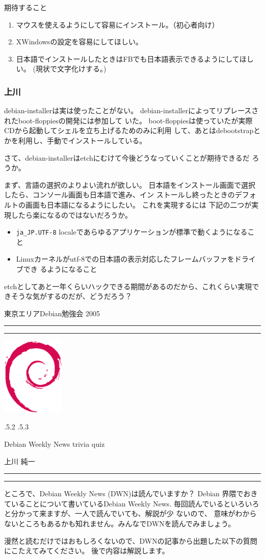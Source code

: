 \documentclass[mingoth]{jsarticle}
\makeatletter
\renewcommand{\section}{\@startsection{section}{1}{\z@}%
    {\Cvs \@plus.5\Cdp \@minus.2\Cdp}%
    {.5\Cvs \@plus.3\Cdp}%
    {\normalfont\Large\headfont\raggedright\centering}} %
\newcommand{\dancersection}[2]{%
\newpage
東京エリアDebian勉強会 2005
\hrule
\vspace{0.5mm}
\hrule
\hfill{}\includegraphics[width=3cm]{image200502/openlogo-nd.eps}\\
\vspace{-4cm}
\begin{center}
  \section{#1}
\end{center}
\hfill{}#2\hspace{3cm}\space\\
\hrule
\hrule
\vspace{1cm}
}
\makeatother
\begin{document}
期待すること
\begin{enumerate}
 \item	  マウスを使えるようにして容易にインストール。（初心者向け）
 \item	  XWindowsの設定を容易にしてほしい。
 \item	  日本語でインストールしたときはFBでも日本語表示できるようにしてほしい。
	   (現状で文字化けする。)
\end{enumerate}


\subsubsection{上川}


debian-installerは実は使ったことがない。
debian-installerによってリプレースされたboot-floppiesの開発には参加して
いた。
boot-floppiesは使っていたが実際CDから起動してシェルを立ち上げるためのみに利用
して、あとはdebootstrapとかを利用し、手動でインストールしている。

さて、debian-installerはetchにむけて今後どうなっていくことが期待できるだ
ろうか。

まず、言語の選択のよりよい流れが欲しい。
日本語をインストール画面で選択したら、コンソール画面も日本語で進み、イン
ストールし終ったときのデフォルトの画面も日本語になるようにしたい。
これを実現するには 下記の二つが実現したら楽になるのではないだろうか。

\begin{itemize}
 \item \verb!ja_JP.UTF-8! localeであらゆるアプリケーションが標準で動くようになること
 \item Linuxカーネルがutf-8での日本語の表示対応したフレームバッファをドライブでき
       るようになること
\end{itemize}

etchとしてあと一年くらいハックできる期間があるのだから、これくらい実現で
きそうな気がするのだが、どうだろう？

\dancersection{Debian Weekly News trivia quiz}{上川 純一}

ところで、Debian Weekly News (DWN)は読んでいますか？
Debian 界隈でおきていることについて書いているDebian Weekly News.
毎回読んでいるといろいろと分かって来ますが、一人で読んでいても、解説が少
ないので、
意味がわからないところもあるかも知れません。みんなでDWNを読んでみましょう。

漫然と読むだけではおもしろくないので、DWNの記事から出題した以下の質問にこたえてみてください。
後で内容は解説します。
\end{document}
